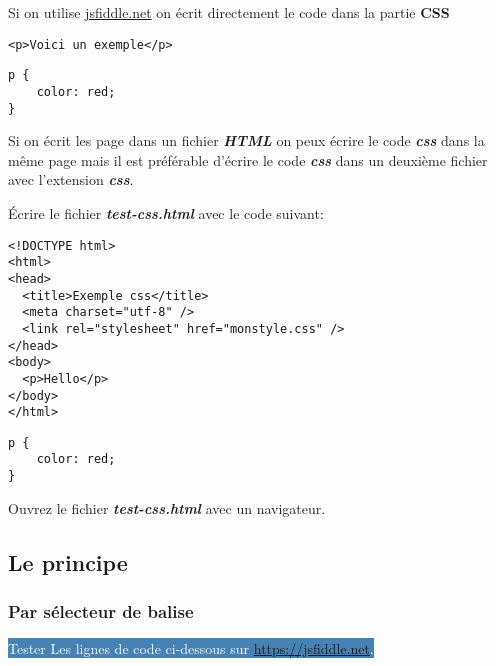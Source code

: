 \documentclass[10pt,dvipsnames, dvips, svgnames]{article}
\begin{document}
\begin{list}{}{}
\item Si on utilise \href{https://jsfiddle.net/}{jsfiddle.net} on écrit directement le code dans la partie \textbf{CSS}\\
\begin{lstlisting}
<p>Voici un exemple</p>
\end{lstlisting}
	
\begin{lstlisting}
p {
	color: red;
}
\end{lstlisting}
\item Si on écrit les page dans un fichier \textbf{\textit{HTML}} on peux écrire le code \textbf{\textit{css}} dans la même page mais il est préférable d'écrire le code \textbf{\textit{css}} dans un deuxième fichier avec l'extension \textbf{\textit{css}}. 

	Écrire le fichier \textbf{\textit{test-css.html}} avec le code suivant:
\begin{lstlisting}
<!DOCTYPE html>
<html>
<head>
  <title>Exemple css</title>
  <meta charset="utf-8" />
  <link rel="stylesheet" href="monstyle.css" />
</head>
<body>
  <p>Hello</p>
</body>
</html>
\end{lstlisting}
\begin{lstlisting}
p {
	color: red;
}
\end{lstlisting}

Ouvrez le fichier  \textbf{\textit{test-css.html}} avec un navigateur.


\end{list}




\subsection{Le principe}

\subsubsection{Par sélecteur de balise}

\colorbox{SteelBlue}{\textcolor{white}{Tester Les lignes de code ci-dessous sur \href{https://jsfiddle.net/}{https://jsfiddle.net}.}}
\end{document}
